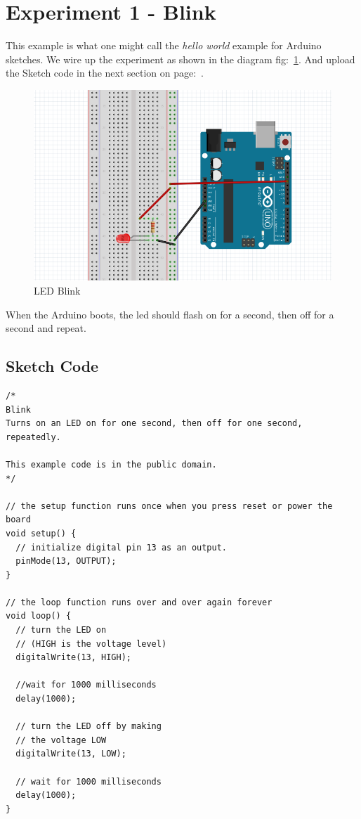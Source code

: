 \chapter*{Experiment 1 - Blink}
This example is what one might call the \textit{hello world} example for \gls{Arduino} sketches. We wire up the experiment as shown in the diagram fig:~\ref{fig:exp1_blink}. And upload the \gls{Sketch} code in the next section on page:~\pageref{sketch:exp1}.

%
\begin{figure}[ht]
	\centering
	\includegraphics[width=12cm]{images/07}
	\caption{LED Blink \citep{fritzing-15}}
	\label{fig:exp1_blink}
\end{figure}
%

When the Arduino boots, the led should flash on for a second, then off for a second and repeat.

\newpage
\section*{Sketch Code}
\label{sketch:exp1}
\begin{lstlisting}
/*
Blink
Turns on an LED on for one second, then off for one second, repeatedly.

This example code is in the public domain.
*/

// the setup function runs once when you press reset or power the board
void setup() {
  // initialize digital pin 13 as an output.
  pinMode(13, OUTPUT);
}

// the loop function runs over and over again forever
void loop() {
  // turn the LED on 
  // (HIGH is the voltage level)
  digitalWrite(13, HIGH);
	
  //wait for 1000 milliseconds
  delay(1000);
	
  // turn the LED off by making 
  // the voltage LOW
  digitalWrite(13, LOW);    
	            
  // wait for 1000 milliseconds              
  delay(1000);
}
\end{lstlisting}